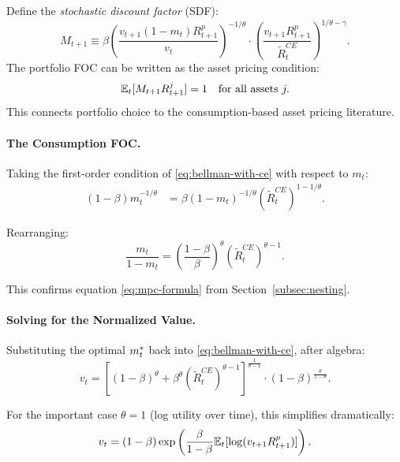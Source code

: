 \begin{calloutnote}
Define the \emph{stochastic discount factor} (SDF):
\begin{equation}
M_{t+1} \equiv \beta \left( \frac{v_{t+1}(1-m_t) R_{t+1}^p}{v_t} \right)^{-1/\theta} \cdot \left( \frac{v_{t+1} R_{t+1}^p}{\tilde{R}_t^{CE}} \right)^{1/\theta - \gamma}.
\label{eq:sdf-ez}
\end{equation}
The portfolio FOC can be written as the asset pricing condition:
\begin{equation}
\mathbb{E}_t[M_{t+1} R_{t+1}^j] = 1 \quad \text{for all assets } j.
\label{eq:asset-pricing}
\end{equation}
This connects portfolio choice to the consumption-based asset pricing literature.
\end{calloutnote}

\paragraph{The Consumption FOC.}

Taking the first-order condition of \eqref{eq:bellman-with-ce} with respect to $m_t$:
\begin{align}
(1-\beta) m_t^{-1/\theta} &= \beta (1-m_t)^{-1/\theta} \left( \tilde{R}_t^{CE} \right)^{1-1/\theta}.
\label{eq:consumption-foc}
\end{align}

Rearranging:
\begin{equation}
\frac{m_t}{1-m_t} = \left( \frac{1-\beta}{\beta} \right)^{\theta} \left( \tilde{R}_t^{CE} \right)^{\theta - 1}.
\label{eq:consumption-foc-ratio}
\end{equation}

This confirms equation \eqref{eq:mpc-formula} from Section~\ref{subsec:nesting}.

\paragraph{Solving for the Normalized Value.}

Substituting the optimal $m_t^{*}$ back into \eqref{eq:bellman-with-ce}, after algebra:
\begin{equation}
v_t = \left[ (1-\beta)^{\theta} + \beta^{\theta} \left( \tilde{R}_t^{CE} \right)^{\theta - 1} \right]^{\frac{1}{\theta - 1}} \cdot (1-\beta)^{\frac{\theta}{1-\theta}}.
\label{eq:v-solution}
\end{equation}

For the important case $\theta = 1$ (log utility over time), this simplifies dramatically:
\begin{equation}
v_t = (1-\beta) \exp\left( \frac{\beta}{1-\beta} \mathbb{E}_t[\log(v_{t+1} R_{t+1}^p)] \right).
\label{eq:v-log-utility}
\end{equation}

